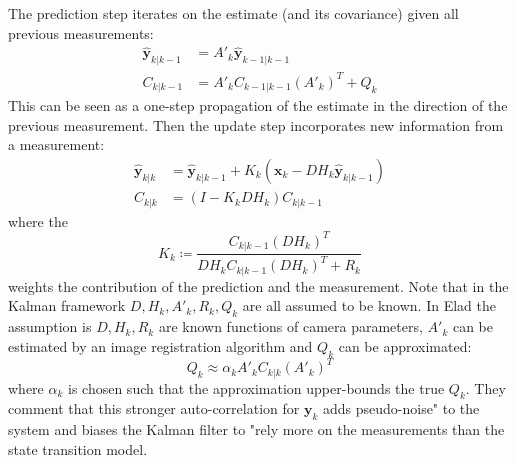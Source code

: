 The prediction step iterates on the estimate (and its covariance) given all previous measurements:
\begin{align}
    \hat{\bm{y}}_{k|k-1} & = A'_k \hat{\bm{y}}_{k-1|k-1}     \\
    C_{k|k-1}            & = A'_k C_{k-1|k-1} (A'_k)^T + Q_k
\end{align}
This can be seen as a one-step propagation of the estimate in the direction of the previous measurement.
%
Then the update step incorporates new information from a measurement:
\begin{align}
    \hat{\bm{y}}_{k|k} & = \hat{\bm{y}}_{k|k-1} + K_k(\bm{x}_k - DH_k\hat{\bm{y}}_{k|k-1} ) \\
    C_{k|k}            & = (I - K_k DH_k)C_{k|k-1}
\end{align}
where the 
\begin{equation}
    K_k \coloneqq \frac{C_{k|k-1}(DH_k)^T}{DH_k C_{k|k-1} (DH_k)^T + R_k }
\end{equation}
weights the contribution of the prediction and the measurement.
%
Note that in the Kalman framework \(D, H_k, A'_k, R_k, Q_k\) are all assumed to be known.
%
In Elad \etal\cite{elad1999} the assumption is \(D, H_k, R_k\) are known functions of camera parameters, \(A'_k\) can be estimated by an image registration algorithm and \(Q_k\) can be approximated:
\begin{equation}
    Q_k \approx \alpha_k A'_k C_{k|k} (A'_k)^T
\end{equation}
where \(\alpha_k\) is chosen such that the approximation upper-bounds the true \(Q_k\).
%
They comment that this stronger auto-correlation for \(\bm{y}_k\) adds pseudo-noise" to the system and biases the Kalman filter to "rely more on the measurements than the state transition model.
